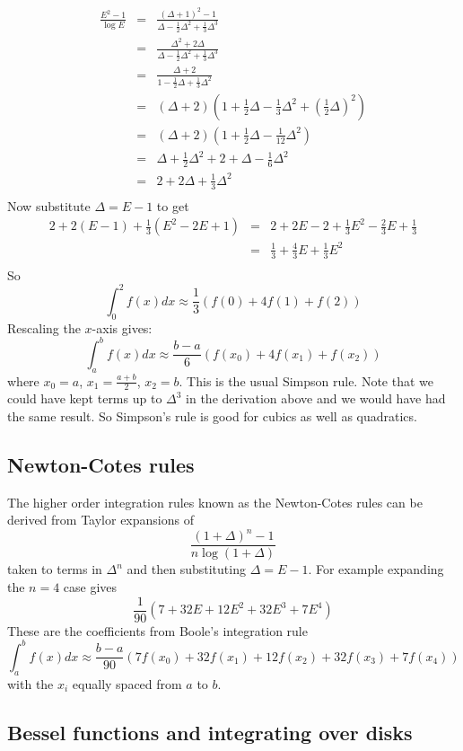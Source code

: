 \documentclass[a4paper]{article}
\theoremstyle{definition}
\begin{document}
\begin{eqnarray*}
\frac{E^2-1}{\log E}
& = & \frac{(\Delta+1)^2-1}{\Delta-\frac{1}{2}\Delta^2+\frac{1}{3}\Delta^3} \\
& = & \frac{\Delta^2+2\Delta}{\Delta-\frac{1}{2}\Delta^2+\frac{1}{3}\Delta^3} \\
& = & \frac{\Delta+2}{1-\frac{1}{2}\Delta+\frac{1}{3}\Delta^2} \\
& = & (\Delta+2)(1+\frac{1}{2}\Delta-\frac{1}{3}\Delta^2+(\frac{1}{2}\Delta)^2) \\
& = & (\Delta+2)(1+\frac{1}{2}\Delta-\frac{1}{12}\Delta^2) \\
& = & \Delta+\frac{1}{2}\Delta^2+2+\Delta-\frac{1}{6}\Delta^2 \\
& = & 2+2\Delta+\frac{1}{3}\Delta^2 \\
\end{eqnarray*}
Now substitute $\Delta=E-1$ to get
\begin{eqnarray*}
2+2(E-1)+\frac{1}{3}(E^2-2E+1) & = &2+2E-2+\frac{1}{3}E^2-\frac{2}{3}E+\frac{1}{3} \\
& = & \frac{1}{3}+\frac{4}{3}E+\frac{1}{3}E^2 \\
\end{eqnarray*}
So
\[
\int_0^2f(x)dx \approx \frac{1}{3}(f(0)+4f(1)+f(2))
\]
Rescaling the $x$-axis gives:
\[
\int_a^bf(x)dx \approx \frac{b-a}{6}(f(x_0)+4f(x_1)+f(x_2))
\]
where $x_0=a$, $x_1=\frac{a+b}{2}$, $x_2=b$.
This is the usual Simpson rule.
Note that we could have kept terms up to $\Delta^3$ in the derivation above and we would have had the same result.
So Simpson's rule is good for cubics as well as quadratics.

\subsection{Newton-Cotes rules}
The higher order integration rules known as the Newton-Cotes rules can be derived from Taylor expansions of
\[
\frac{(1+\Delta)^n-1}{n\log(1+\Delta)}
\]
taken to terms in $\Delta^n$ and then substituting $\Delta=E-1$.
For example expanding the $n=4$ case gives
\[
\frac{1}{90}(7+32E+12E^2+32E^3+7E^4)
\]
These are the coefficients from Boole's integration rule
\[
\int_a^bf(x)dx \approx \frac{b-a}{90}(7f(x_0)+32f(x_1)+12f(x_2)+32f(x_3)+7f(x_4))
\]
with the $x_i$ equally spaced from $a$ to $b$.

\subsection{Bessel functions and integrating over disks}
\end{document}
